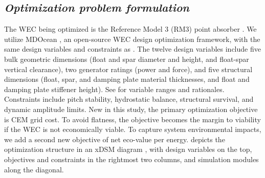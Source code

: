 \subsection{\textit{Optimization problem formulation}}
The WEC being optimized is the Reference Model 3 (RM3) point absorber \cite{RM3}.
We utilize MDOcean \cite{mccabe_mdocean_2024}, an open-source WEC design optimization framework, with the same design variables and constraints as \cite{mccabe_leveraging_2026}.
The twelve design variables include five bulk geometric dimensions (float and spar diameter and height, and float-spar vertical clearance), two generator ratings (power and force), and five structural dimensions (float, spar, and damping plate material thicknesses, and float and damping plate stiffener height).
See \cite{mccabe_leveraging_2026} for variable ranges and rationales.
Constraints include pitch stability, hydrostatic balance, structural survival, and dynamic amplitude limits.
New in this study, the primary optimization objective is CEM grid cost.
To avoid flatness, the objective becomes the margin to viability if the WEC is not economically viable.
To capture system environmental impacts, we add a second new objective of net eco-value per energy.
 depicts the optimization structure in an xDSM diagram \cite{lambe_extensions_2012}, with design variables on the top, objectives and constraints in the rightmost two columns, and simulation modules along the diagonal.

